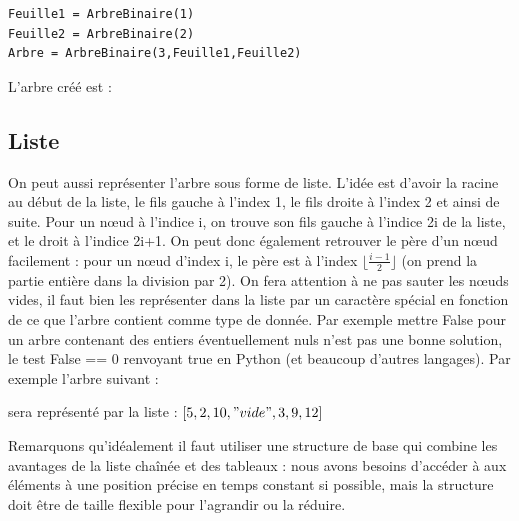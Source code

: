 \documentclass{report}
\begin{document}
\begin{lstlisting}
Feuille1 = ArbreBinaire(1)
Feuille2 = ArbreBinaire(2)
Arbre = ArbreBinaire(3,Feuille1,Feuille2)
\end{lstlisting}

L'arbre créé est :
\begin{center}
\end{center}

\subsection{Liste}

On peut aussi représenter l'arbre sous forme de liste. L'idée est d'avoir la racine au début de la liste, le fils gauche à l'index 1, le fils droite à l'index 2 et ainsi de suite. Pour un nœud à l'indice i, on trouve son fils gauche à l'indice 2i de la liste, et le droit à l'indice 2i+1. 
On peut donc également retrouver le père d'un nœud facilement : pour un nœud d'index i, le père est à l'index $\lfloor \frac{i-1}{2} \rfloor$ (on prend la partie entière dans la division par 2).
On fera attention à ne pas sauter les nœuds vides, il faut bien les représenter dans la liste par un caractère spécial en fonction de ce que l'arbre contient comme type de donnée. Par exemple mettre False pour un arbre contenant des entiers éventuellement nuls n'est pas une bonne solution, le test False == 0 renvoyant true en Python (et beaucoup d'autres langages).
Par exemple l'arbre suivant :

\begin{center}
\end{center}

sera représenté par la liste :
$[5,2,10,"vide",3,9,12]$

Remarquons qu'idéalement il faut utiliser une structure de base qui combine les avantages de la liste chaînée et des tableaux : nous avons besoins d'accéder à aux éléments à une position précise en temps constant si possible, mais la structure doit être de taille flexible pour l'agrandir ou la réduire. 
\end{document}
